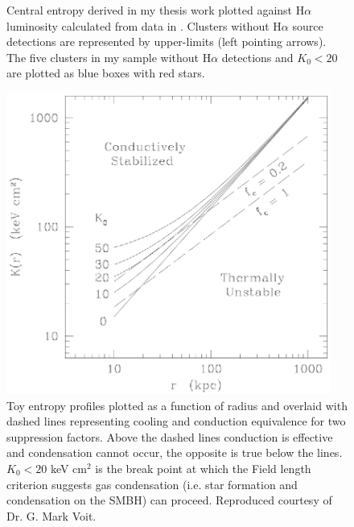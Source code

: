 \documentclass[11pt]{article}
\begin{document}
\begin{figure}[t]
\begin{minipage}[t]{0.5\linewidth}
        \caption{\small Central entropy derived in my thesis work
        plotted against H$\alpha$ luminosity calculated from data in
	\cite{1999MNRAS.306..857C}. Clusters without H$\alpha$ source
	detections are represented by upper-limits (left pointing arrows). The
	five clusters in my sample without H$\alpha$ detections and $K_0 < 20$
	are plotted as blue boxes with red stars.}
        \label{fig:hak0}
    \end{minipage}
    \hspace{0.1in}
    \begin{minipage}[t]{0.5\linewidth}
        \centering
        \includegraphics*[width=0.95\textwidth, trim=0mm 0mm 0mm 0mm, clip]{conduction}
        \caption{\small 
	Toy entropy profiles plotted as a function of radius and overlaid with
	dashed lines representing cooling and conduction equivalence for two
	suppression factors. Above the dashed lines conduction is effective
	and condensation cannot occur, the opposite is true below the
	lines. $K_0 < 20$ keV cm$^2$ is the break point at which the Field
	length criterion suggests gas condensation (i.e. star formation and
	condensation on the SMBH) can proceed. Reproduced courtesy of Dr. G.
	Mark Voit.}
        \label{fig:conduction}
    \end{minipage}
\end{figure}
\end{document}
